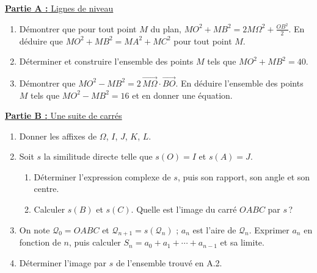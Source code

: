 \underline{\textbf{Partie A :} Lignes de niveau}
\begin{enumerate}
      \item D\'emontrer que pour tout point $M$ du plan, $MO^2 + MB^2 = 2M\Omega^2 + \frac{OB^2}{2}$.
            En d\'eduire que $MO^2 + MB^2 = MA^2 + MC^2$ pour tout point $M$.
      \item D\'eterminer et construire l'ensemble des points $M$ tels que $MO^2 + MB^2 = 40$.
      \item D\'emontrer que $MO^2 - MB^2 = 2\,\overrightarrow{M\Omega} \cdot \overrightarrow{BO}$. En d\'eduire l'ensemble des points $M$ tels que
            $MO^2 - MB^2 = 16$ et en donner une \'equation.
\end{enumerate}
\underline{\textbf{Partie B :} Une suite de carr\'es}
\begin{enumerate}
      \item Donner les affixes de $\Omega$, $I$, $J$, $K$, $L$.
      \item Soit $s$ la similitude directe telle que $s(O) = I$ et $s(A) = J$.
            \begin{enumerate}
            \item D\'eterminer l'expression complexe de $s$, puis son rapport, son angle et son centre.
            \item Calculer $s(B)$ et $s(C)$. Quelle est l'image du carr\'e $OABC$ par $s$\,?
            \end{enumerate}
      \item On note $\mathscr{Q}_0 = OABC$ et $\mathscr{Q}_{n+1} = s(\mathscr{Q}_n)$ ; $a_n$ est l'aire de $\mathscr{Q}_n$.
            Exprimer $a_n$ en fonction de $n$, puis calculer $S_n = a_0 + a_1 + \cdots + a_{n-1}$ et sa limite.
      \item D\'eterminer l'image par $s$ de l'ensemble trouv\'e en A.2.
\end{enumerate}


